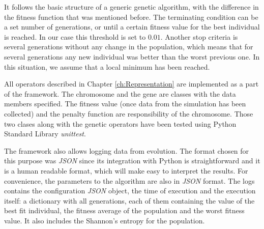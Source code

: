 It follows the basic structure of a generic genetic algorithm, with the difference in the fitness function that was mentioned before. The terminating condition can be a set number of generations, or until a certain fitness value for the best individual is reached. In our case this threshold is set to $0.01$. Another stop criteria is several generations without any change in the population, which means that for several generations any new individual was better than the worst previous one. In this situation, we assume that a local minimum has been reached. 

All operators described in Chapter \ref{ch:Representation} are implemented as a part of the framework. The chromosome and the gene are classes with the data members specified. The fitness value (once data from the simulation has been collected) and the penalty function are responsibility of the chromosome. Those two clases along with the genetic operators have been tested using Python Standard Library \textit{unittest}.

The framework also allows logging data from evolution. The format chosen for this purpose was \textit{JSON} since its integration with Python is straightforward and it is a human readable format, which will make easy to interpret the results. For convenience, the parameters to the algorithm are also in \textit{JSON} format. The logs contains the configuration \textit{JSON} object, the time of execution and the execution itself: a dictionary with all generations, each of them containing the value of the best fit individual, the fitness average of the population and the worst fitness value. It also includes the Shannon's entropy for the population.

